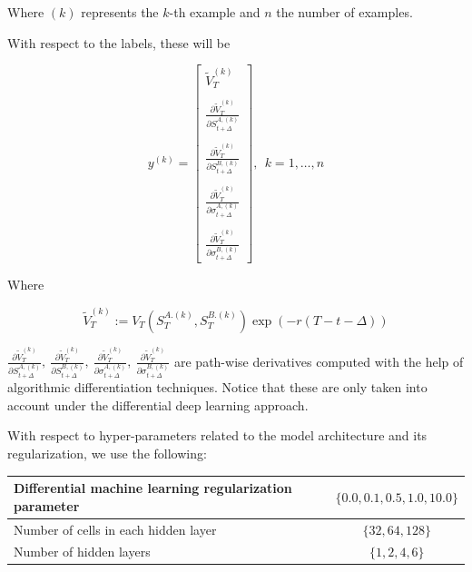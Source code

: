 Where $(k)$ represents the $k$-th example and $n$ the number of examples.

With respect to the labels, these will be 

$$
y^{(k)}=\left[\begin{array}{l}
\tilde{V}_{T}^{(k)} \\ \\
\frac{\partial \tilde{V}_{T}^{(k)}}{\partial S_{t+\Delta}^{A,(k)}} \\ \\
\frac{\partial \tilde{V}_{T}^{(k)}}{\partial S_{t+\Delta}^{B,(k)}} \\ \\
\frac{\partial \tilde{V}_{T}^{(k)}}{\partial \sigma_{t+\Delta}^{A,(k)}} \\ \\
\frac{\partial \tilde{V}_{T}^{(k)}}{\partial \sigma_{t+\Delta}^{B,(k)}}
\end{array}\right],\ \ k=1, \ldots, n
$$

Where

$$\tilde{V}_{T}^{(k)} := V_T\left(S_T^{A.(k)}, S_T^{B.(k)}\right)\exp\left(-r\left(T-t-\Delta\right)\right)$$

$\frac{\partial \tilde{V}_{T}^{(k)}}{\partial S_{t+\Delta}^{A,(k)}},\  
\frac{\partial \tilde{V}_{T}^{(k)}}{\partial S_{t+\Delta}^{B,(k)}},\ 
\frac{\partial \tilde{V}_{T}^{(k)}}{\partial \sigma_{t+\Delta}^{A,(k)}},\ 
\frac{\partial \tilde{V}_{T}^{(k)}}{\partial \sigma_{t+\Delta}^{B,(k)}}
$ are path-wise derivatives computed with the help of algorithmic differentiation techniques. Notice that these are only taken into account under the differential deep learning approach.

With respect to hyper-parameters related to the model architecture and its regularization, we use the following:



\begin{center}
\begin{tabular}{||l | c||} 
 \hline
 Differential machine learning regularization parameter & $\{0.0, 0.1, 0.5, 1.0, 10.0\}$ \\
 \hline
 Number of cells in each hidden layer  & $\{32, 64, 128\}$  \\
 \hline
 Number of hidden layers  & $\{1 ,2 ,4 ,6\}$  \\
 \hline
 \end{tabular}
\end{center}


